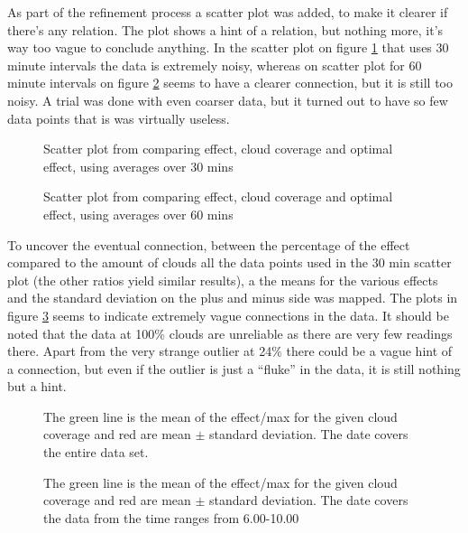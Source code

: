 As part of the refinement process a scatter plot was added, to make it
clearer if there's any relation.  The plot shows a hint of a relation,
but nothing more, it's way too vague to conclude anything.  In the
scatter plot on figure \ref{fig:scatter30} that uses 30 minute
intervals the data is extremely noisy, whereas on scatter plot for 60
minute intervals on figure \ref{fig:scatter60} seems to have a clearer
connection, but it is still too noisy.  A trial was done with even
coarser data, but it turned out to have so few data points that is was
virtually useless.

\begin{figure}
  \centering
  \tiny
  
  \caption{Scatter plot from comparing effect, cloud coverage and
    optimal effect, using averages over 30 mins}
  \label{fig:scatter30}
\end{figure}

\begin{figure}
  \centering
      \tiny
      
  \caption{Scatter plot from comparing effect, cloud coverage and
    optimal effect, using averages over 60 mins}
  \label{fig:scatter60}
\end{figure}

To uncover the eventual connection, between the percentage of the
effect compared to the amount of clouds all the data points used in
the 30 min scatter plot (the other ratios yield similar results), a
the means for the various effects and the standard deviation on the
plus and minus side was mapped.  The plots in figure
\ref{fig:stattotal} seems to indicate extremely vague connections in
the data.  It should be noted that the data at 100\% clouds are
unreliable as there are very few readings there.  Apart from the very
strange outlier at 24\% there could be a vague hint of a connection,
but even if the outlier is just a ``fluke'' in the data, it is still
nothing but a hint.

\begin{figure}
  \centering    
  \tiny
  
  \caption{The green line is the mean of the effect/max for the given
    cloud coverage and red are mean $\pm$ standard deviation.  The
    date covers the entire data set.}
  \label{fig:stattotal}
\end{figure}

\begin{figure}
  \centering
  \tiny
  
  \caption{The green line is the mean of the effect/max for the given
    cloud coverage and red are mean $\pm$ standard deviation.  The
    date covers the data from the time ranges from 6.00-10.00}
  \label{fig:stat0610}
\end{figure}

